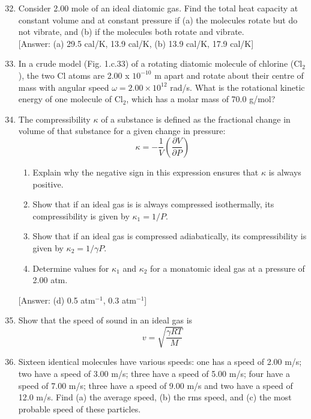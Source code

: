 \documentclass{article}
\renewcommand{\frac}[2]{\dfrac{#1}{#2}}
\begin{document}
\begin{enumerate}
    \setcounter{enumi}{31}
      \item Consider 2.00 mole of an ideal diatomic gas. Find the total heat capacity at constant volume and at constant pressure if (a) the molecules rotate but do not vibrate, and (b) if the molecules both rotate and vibrate.\\[1mm]
      [Answer: (a) 29.5 cal/K, 13.9 cal/K, (b) 13.9 cal/K, 17.9 cal/K]
      \item In a crude model (Fig. 1.c.33) of a rotating diatomic molecule of chlorine (\( \text{Cl}_2 \)), the two Cl atoms are 2.00 x \( 10^{-10} \) m apart and rotate about their centre of mass with angular speed \( \omega = 2.00 \times 10^{12} \) rad/s. What is the rotational kinetic energy of one molecule of \( \text{Cl}_2 \), which has a molar mass of 70.0 g/mol?
    \begin{tikzpicture}
    \end{tikzpicture}
      \item The compressibility \( \kappa \) of a substance is defined as the fractional change in volume of that substance for a given change in pressure:
      \[
      \kappa = -\frac{1}{V} \left( \frac{\partial V}{\partial P} \right)
      \]
      \begin{enumerate}
        \item Explain why the negative sign in this expression ensures that \( \kappa \) is always positive.
        \item Show that if an ideal gas is is always compressed isothermally, its compressibility is given by \( \kappa_1 = 1/P \).
        \item Show that if an ideal gas is compressed adiabatically, its compressibility is given by \( \kappa_2 = 1/\gamma P \).
        \item Determine values for \( \kappa_1 \) and \( \kappa_2 \) for a monatomic ideal gas at a pressure of 2.00 atm.
      \end{enumerate}
      [Answer: (d) 0.5 atm\(^{-1}\), 0.3 atm\(^{-1}\)]
      \item Show that the speed of sound in an ideal gas is
      \[
      v = \sqrt{\frac{\gamma RT}{M}}
      \]
      \item Sixteen identical molecules have various speeds: one has a speed of 2.00 m/s; two have a speed of 3.00 m/s; three have a speed of 5.00 m/s; four have a speed of 7.00 m/s; three have a speed of 9.00 m/s and two have a speed of 12.0 m/s. Find (a) the average speed, (b) the rms speed, and (c) the most probable speed of these particles.

\end{enumerate}
\end{document}
